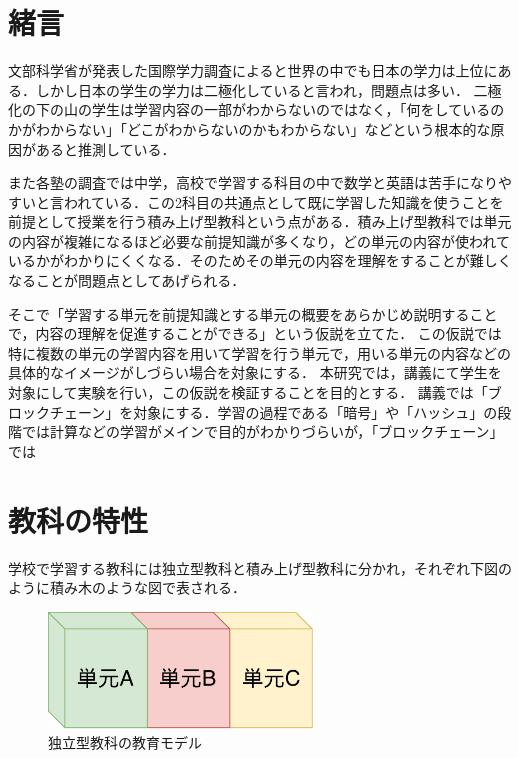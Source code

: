\documentclass[a4j,12pt]{jsarticle}
\begin{document}

\semi

\section{緒言}
文部科学省が発表した国際学力調査によると世界の中でも日本の学力は上位にある．しかし日本の学生の学力は二極化していると言われ，問題点は多い．
二極化の下の山の学生は学習内容の一部がわからないのではなく，「何をしているのかがわからない」「どこがわからないのかもわからない」などという根本的な原因があると推測している．

また各塾の調査では中学，高校で学習する科目の中で数学と英語は苦手になりやすいと言われている．この2科目の共通点として既に学習した知識を使うことを前提として授業を行う積み上げ型教科という点がある．積み上げ型教科では単元の内容が複雑になるほど必要な前提知識が多くなり，どの単元の内容が使われているかがわかりにくくなる．そのためその単元の内容を理解をすることが難しくなることが問題点としてあげられる．

そこで「学習する単元を前提知識とする単元の概要をあらかじめ説明することで，内容の理解を促進することができる」という仮説を立てた．
この仮説では特に複数の単元の学習内容を用いて学習を行う単元で，用いる単元の内容などの具体的なイメージがしづらい場合を対象にする．
本研究では，講義にて学生を対象にして実験を行い，この仮説を検証することを目的とする．
講義では「ブロックチェーン」を対象にする．学習の過程である「暗号」や「ハッシュ」の段階では計算などの学習がメインで目的がわかりづらいが，「ブロックチェーン」では

\newpage
\section{教科の特性}
学校で学習する教科には独立型教科と積み上げ型教科に分かれ，それぞれ下図のように積み木のような図で表される．\\

\begin{figure}[H]
\centering
\includegraphics[width=7cm]{02.pdf}
\caption{独立型教科の教育モデル}
\label{fig:02}
\end{figure} 
\end{document}
